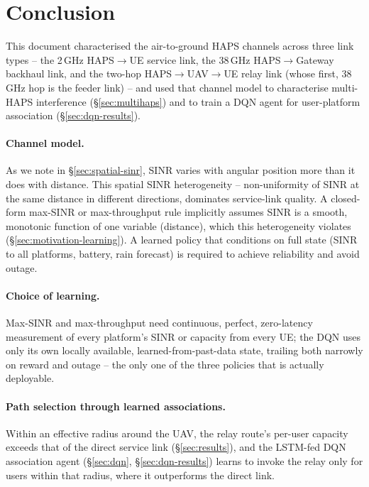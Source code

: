 \documentclass[]{ieeeaccess}
\begin{document}
\section{Conclusion}
\label{sec:conclusion}

This document characterised the air-to-ground HAPS channels
across three link types -- the 2\,GHz HAPS$\rightarrow$UE service link,
the 38\,GHz HAPS$\rightarrow$Gateway backhaul link, and the two-hop
HAPS$\rightarrow$UAV$\rightarrow$UE relay link (whose first, 38\,GHz hop is
the feeder link) -- and used that channel
model to characterise multi-HAPS interference (\S\ref{sec:multihaps})
and to
train a DQN agent for user-platform association (\S\ref{sec:dqn-results}).

\paragraph{Channel model.} As we note in \S\ref{sec:spatial-sinr}, SINR varies with angular position more than it does with distance. This spatial SINR heterogeneity -- non-uniformity of SINR at the same distance in different directions, dominates service-link quality. A closed-form max-SINR or max-throughput rule implicitly assumes SINR is a smooth, monotonic function of one variable (distance), which this heterogeneity violates (\S\ref{sec:motivation-learning}). A learned policy that conditions on full state (SINR to all platforms, battery, rain forecast) is required to achieve reliability and avoid outage.

\paragraph{Choice of learning.} Max-SINR and max-throughput need continuous, perfect, zero-latency measurement of every platform's SINR or capacity from every UE; the DQN uses only its own locally available, learned-from-past-data state, trailing both narrowly on reward and outage -- the only one of the three policies that is actually deployable.

\paragraph{Path selection through learned associations.} Within an effective radius around the UAV, the relay route's per-user capacity exceeds that of the direct service link (\S\ref{sec:results}), and the LSTM-fed DQN association agent (\S\ref{sec:dqn}, \S\ref{sec:dqn-results}) learns to invoke the relay only for users within that radius, where it outperforms the direct link.



\EOD
\end{document}
